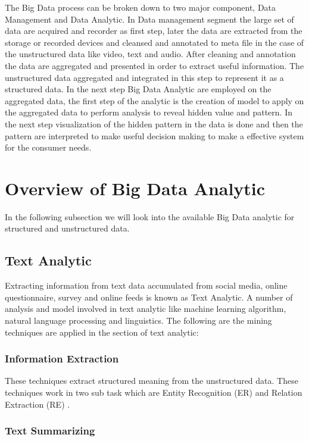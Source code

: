 \documentclass[sigconf]{acmart}
\begin{document}
 The Big Data process can be broken down to two major component, Data Management and Data Analytic. In Data management segment the large set of data are acquired and recorder as first step, later the data are extracted from the storage or recorded devices and cleansed and annotated to meta file in the case of the unstructured data like video, text and audio. After cleaning and annotation the data are aggregated and presented in order to extract useful information. The unstructured data aggregated and integrated in this step to represent it as a structured data. In the next step Big Data Analytic are employed on the aggregated data, the first step of the analytic is the creation of model to apply on the aggregated data to perform analysis to reveal hidden value and pattern. In the next step visualization of the hidden pattern in the data is done and then the pattern are interpreted to make useful decision making to make a effective system for the consumer needs.
 
 \section{Overview of Big Data Analytic}
 In the following subsection we will look into the available Big Data analytic for structured and unstructured data.
 
 \subsection{Text Analytic}
 
 Extracting information from text data accumulated from social media, online questionnaire, survey and online feeds is known as Text Analytic. A number of analysis and model involved in text analytic like machine learning algorithm, natural language processing and linguistics. The following are the mining techniques are applied in the section of text analytic:
 
 
\subsubsection{Information Extraction}

These techniques extract structured meaning from the unstructured data. These techniques work in two sub task which are Entity Recognition (ER) \cite{bigdata} and Relation Extraction (RE) \cite{bigdata}.

\subsubsection{Text Summarizing}
\end{document}
